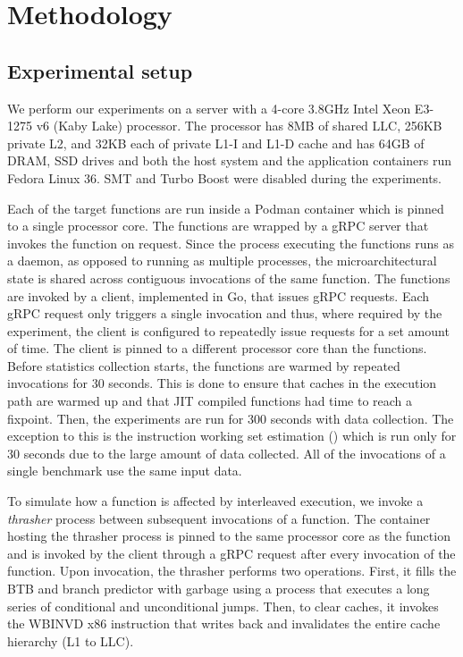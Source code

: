 \section{Methodology}
\label{wosc:sec:label}

    \subsection{Experimental setup}
We perform our experiments on a server with a 4-core 3.8GHz Intel Xeon E3-1275 v6 (Kaby Lake) processor. The processor has 8MB of shared LLC, 256KB private L2, and 32KB each of private L1-I and L1-D cache and has 64GB of DRAM, SSD drives and both the host system and the application containers run Fedora Linux 36. SMT and Turbo Boost were disabled during the experiments.

Each of the target functions are run inside a Podman container which is pinned to a single processor core. The functions are wrapped by a gRPC server that invokes the function on request. Since the process executing the functions runs as a daemon, as opposed to running as multiple processes, the microarchitectural state is shared across contiguous invocations of the same function. The functions are invoked by a client, implemented in Go, that issues gRPC requests. Each gRPC request only triggers a single invocation and thus, where required by the experiment, the client is configured to repeatedly issue requests for a set amount of time. The client is pinned to a different processor core than the functions. Before statistics collection starts, the functions are warmed by repeated invocations for 30 seconds. This is done to ensure that caches in the execution path are warmed up and that JIT compiled functions had time to reach a fixpoint. Then, the experiments are run for 300 seconds with data collection. The exception to this is the instruction working set estimation () which is run only for 30 seconds due to the large amount of data collected. All of the invocations of a single benchmark use the same input data.

To simulate how a function is affected by interleaved execution, we invoke a \emph{thrasher} process between subsequent invocations of a function. The container hosting the thrasher process is pinned to the same processor core as the function and is invoked by the client through a gRPC request after every invocation of the function. Upon invocation, the thrasher performs two operations. First, it fills the BTB and branch predictor with garbage using a process \cite{serverless_state} that executes a long series of conditional and unconditional jumps. Then, to clear caches, it invokes the WBINVD x86 instruction that writes back and invalidates the entire cache hierarchy (L1 to LLC).

